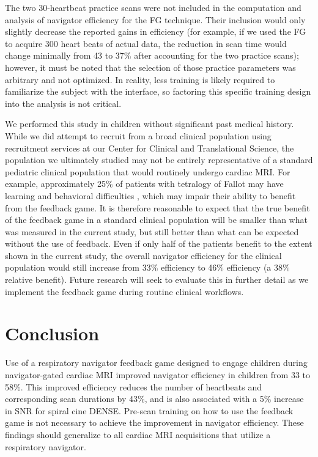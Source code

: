 		The two 30-heartbeat practice scans were not included in the computation and analysis of navigator efficiency for the FG technique. Their inclusion would only slightly decrease the reported gains in efficiency (for example, if we used the FG to acquire 300 heart beats of actual data, the reduction in scan time would change minimally from 43 to 37\% after accounting for the two practice scans); however, it must be noted that the selection of those practice parameters was arbitrary and not optimized. In reality, less training is likely required to familiarize the subject with the interface, so factoring this specific training design into the analysis is not critical.
		
		We performed this study in children without significant past medical history. While we did attempt to recruit from a broad clinical population using recruitment services at our Center for Clinical and Translational Science, the population we ultimately studied may not be entirely representative of a standard pediatric clinical population that would routinely undergo cardiac MRI. For example, approximately 25\% of patients with tetralogy of Fallot may have learning and behavioral difficulties \cite{Piran2011}, which may impair their ability to benefit from the feedback game. It is therefore reasonable to expect that the true benefit of the feedback game in a standard clinical population will be smaller than what was measured in the current study, but still better than what can be expected without the use of feedback. Even if only half of the patients benefit to the extent shown in the current study, the overall navigator efficiency for the clinical population would still increase from 33\% efficiency to 46\% efficiency (a 38\% relative benefit). Future research will seek to evaluate this in further detail as we implement the feedback game during routine clinical workflows.
		
\section{Conclusion}
	Use of a respiratory navigator feedback game designed to engage children during navigator-gated cardiac MRI improved navigator efficiency in children from 33 to 58\%. This improved efficiency reduces the number of heartbeats and corresponding scan durations by 43\%, and is also associated with a 5\% increase in SNR for spiral cine DENSE. Pre-scan training on how to use the feedback game is not necessary to achieve the improvement in navigator efficiency. These findings should generalize to all cardiac MRI acquisitions that utilize a respiratory navigator.